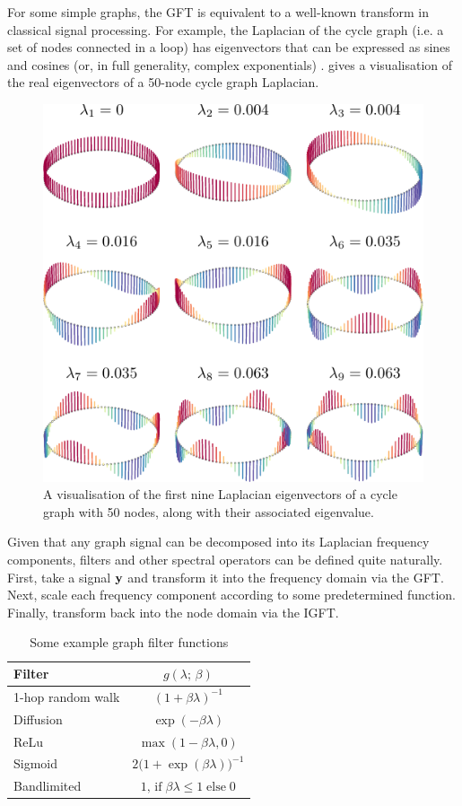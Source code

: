 For some simple graphs, the GFT is equivalent to a well-known transform in classical signal processing. For example, the Laplacian of the cycle graph (i.e. a set of nodes connected in a loop) has eigenvectors that can be expressed as sines and cosines (or, in full generality, complex exponentials) \citep{Puschel2003}.  gives a visualisation of the real eigenvectors of a 50-node cycle graph Laplacian. 

\begin{figure}[t]
	\centering
		\includegraphics[width=0.65\linewidth]{Figures/loop_plot.pdf}
        \caption[A visualisation of the real Laplacian eigenvectors of the cycle graph]{A visualisation of the first nine Laplacian eigenvectors of a cycle graph with 50 nodes, along with their associated eigenvalue.}
	\label{fig:cycle_eighs}
\end{figure}

Given that any graph signal can be decomposed into its Laplacian frequency components, filters and other spectral operators can be defined quite naturally. First, take a signal $\mathbf{y}$ and transform it into the frequency domain via the GFT. Next, scale each frequency component according to some predetermined function. Finally, transform back into the node domain via the IGFT. 


\begin{table}
    \centering
    \def\arraystretch{1.7}
    \begin{tabular}{@{}l c@{}}
        \toprule
        \textbf{Filter}   & $g(\lambda; \,\beta)$   \\
        \midrule
        1-hop random walk & $(1 + \beta \lambda)^{-1}$ \\
        Diffusion         & $\exp(-\beta \lambda)$\\
        ReLu              & $\max (1 - \beta \lambda, 0)$\\
        Sigmoid           & $2 \big( 1 + \exp(\beta \lambda)\big)^{-1}$\\
        Bandlimited       & $1, \,\text{if} \; \beta \lambda \leq 1 \; \text{else} \; 0$ \\
        \bottomrule
       \end{tabular}
       \caption[Example graph filter functions]{Some example graph filter functions}
        \label{tab:filters}
\end{table}

